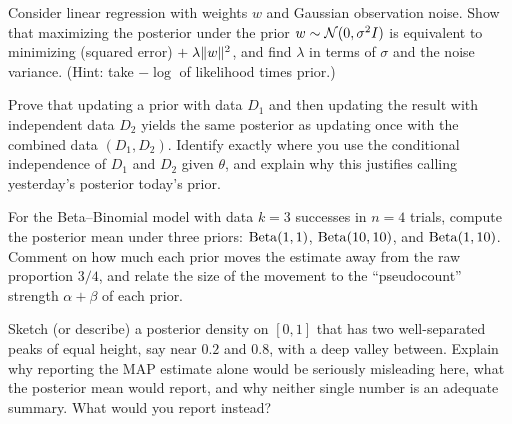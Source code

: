 \begin{exercise}
Consider linear regression with weights $w$ and Gaussian observation noise. Show that
maximizing the posterior under the prior $w\sim\mathcal{N}(0,\sigma^2 I)$ is equivalent to
minimizing (squared error) $+\;\lambda\lVert w\rVert^2$, and find $\lambda$ in terms of $\sigma$
and the noise variance. (Hint: take $-\log$ of likelihood times prior.)
\end{exercise}

\begin{exercise}
Prove that updating a prior with data $D_1$ and then updating the result with independent
data $D_2$ yields the same posterior as updating once with the combined data $(D_1,D_2)$.
Identify exactly where you use the conditional independence of $D_1$ and $D_2$ given
$\theta$, and explain why this justifies calling yesterday's posterior today's prior.
\end{exercise}

\begin{exercise}
For the Beta--Binomial model with data $k=3$ successes in $n=4$ trials, compute the
posterior mean under three priors: $\operatorname{Beta}(1,1)$, $\operatorname{Beta}(10,10)$, and $\operatorname{Beta}(1,10)$. Comment on
how much each prior moves the estimate away from the raw proportion $3/4$, and relate the
size of the movement to the ``pseudocount'' strength $\alpha+\beta$ of each prior.
\end{exercise}

\begin{exercise}
Sketch (or describe) a posterior density on $[0,1]$ that has two well-separated peaks of
equal height, say near $0.2$ and $0.8$, with a deep valley between. Explain why reporting
the MAP estimate alone would be seriously misleading here, what the posterior mean would
report, and why neither single number is an adequate summary. What would you report
instead?
\end{exercise}
